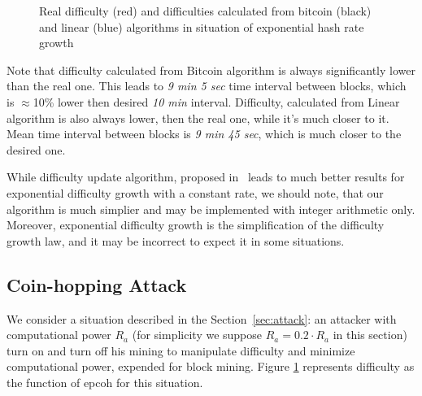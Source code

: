 \documentclass[]{llncs}
\newcommand{\AttackName}{Coin-hopping Attack}
\begin{document}
\begin{figure}[h]
\caption{Real difficulty (red) and difficulties calculated from bitcoin (black) and linear (blue) algorithms in situation of exponential hash rate growth}
\label{fig:exp}
\end{figure}

Note that difficulty calculated from Bitcoin algorithm is always significantly lower than the real one.
This leads to \textit{9 min 5 sec} time interval between blocks, which is $\approx$10\% lower then desired \textit{10 min} interval.
Difficulty, calculated from Linear algorithm is also always lower, then the real one, while it's much closer to it.
Mean time interval between blocks is \textit{9 min 45 sec}, which is much closer to the desired one.

While difficulty update algorithm, proposed in~\cite{kraft2015difficulty} leads to much better results for exponential difficulty growth with a constant rate, we should note, that our algorithm is much simplier and may be implemented with integer arithmetic only.
Moreover, exponential difficulty growth is the simplification of the difficulty growth law, and it may be incorrect to expect it in some situations.

\subsection{\AttackName}

We consider a situation described in the Section~\ref{sec:attack}: an attacker with computational power \(R_a\) (for simplicity we suppose \(R_a=0.2 \cdot R_a \) in this section) turn on and turn off his mining to manipulate difficulty and minimize computational power, expended for block mining.
Figure \ref{fig:exp} represents difficulty as the function of epcoh for this situation.
\end{document}
